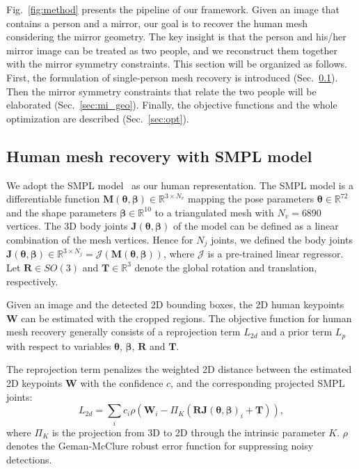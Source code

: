 

Fig.~\ref{fig:method} presents the pipeline of our framework. Given an image that contains a person and a mirror, our goal is to recover the human mesh considering the mirror geometry. The key insight is that the person and his/her mirror image can be treated as two people, and we reconstruct them together with the mirror symmetry constraints. This section will be organized as follows. First, the formulation of single-person mesh recovery is introduced (Sec.~\ref{sec:spmr}). Then the mirror symmetry constraints that relate the two people will be elaborated (Sec.~\ref{sec:mi_geo}). Finally, the objective functions and the whole optimization are described (Sec.~\ref{sec:opt}).

\subsection{Human mesh recovery with SMPL model}
\label{sec:spmr}

We adopt the SMPL model~\cite{SMPL:2015} as our human representation. The SMPL model is a differentiable function $\bm M(\bm \theta, \bm \beta) \in \mathbb R^{3\times N_v}$ mapping the pose parameters $\bm \theta \in \mathbb R^{72}$ and the shape parameters $\bm{\beta} \in \mathbb R^{10}$ to a triangulated mesh with $N_v = 6890$ vertices. The 3D body joints $\bm J(\bm\theta, \bm\beta)$ of the model can be defined as a linear combination of the mesh vertices. Hence for $N_j$ joints, we defined the body joints $\bm J(\bm\theta, \bm\beta) \in \mathbb{R}^{3\times N_j} = \mathcal{J}(\bm M(\bm\theta, \bm\beta))$, where $\mathcal{J}$ is a pre-trained linear regressor. Let $\bm R \in SO(3)$ and $\bm T \in \mathbb R^3$ denote the global rotation and translation, respectively.

Given an image and the detected 2D bounding boxes, the 2D human keypoints $\bm W$ can be estimated with the cropped regions. The objective function for human mesh recovery generally consists of a reprojection term $L_{2d}$ and a prior term $L_p$ with respect to variables $\bm \theta$, $\bm \beta$, $\bm R$ and $\bm T$.

The reprojection term penalizes the weighted 2D distance between the estimated 2D keypoints $\bm{W}$ with the confidence $c$, and the corresponding projected SMPL joints:
\begin{equation}
    L_{2d} = \sum_i c_i\rho(\bm{W}_i - \Pi_K(\bm{R}\bm{J}(\bm\theta, \bm\beta)_i + \bm{T})),
\end{equation}
where $\Pi_K$ is the projection from 3D to 2D through the intrinsic parameter $K$. $\rho$ denotes the Geman-McClure robust error function for suppressing noisy detections. 

